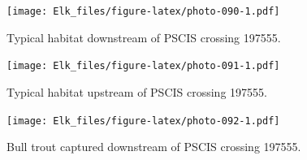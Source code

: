 \documentclass[
]{book}
\begin{document}
\begin{figure}
\centering
\texttt{[image: Elk\_files/figure-latex/photo-090-1.pdf]}
\caption{\label{fig:photo-090}Typical habitat downstream of PSCIS crossing 197555.}
\end{figure}

\begin{figure}
\centering
\texttt{[image: Elk\_files/figure-latex/photo-091-1.pdf]}
\caption{\label{fig:photo-091}Typical habitat upstream of PSCIS crossing 197555.}
\end{figure}

\begin{figure}
\centering
\texttt{[image: Elk\_files/figure-latex/photo-092-1.pdf]}
\caption{\label{fig:photo-092}Bull trout captured downstream of PSCIS crossing 197555.}
\end{figure}

  
\end{document}
